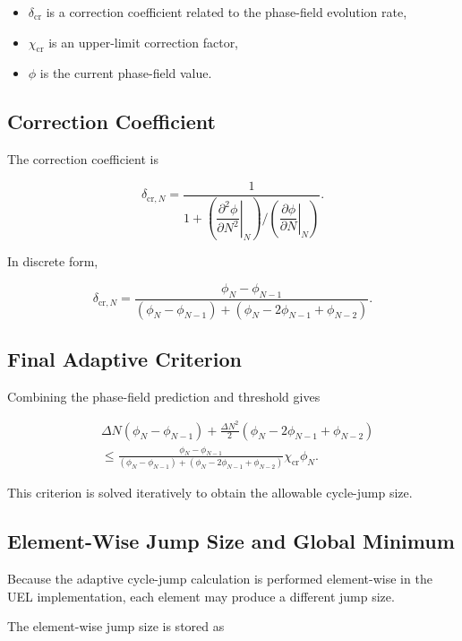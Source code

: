 ﻿\documentclass[11pt,a4paper]{article}
\begin{document}
\begin{itemize}[leftmargin=*]
    \item $\delta_{\mathrm{cr}}$ is a correction coefficient related to the phase-field evolution rate,
    \item $\chi_{\mathrm{cr}}$ is an upper-limit correction factor,
    \item $\phi$ is the current phase-field value.
\end{itemize}

\subsection{Correction Coefficient}

The correction coefficient is

\[
\delta_{\mathrm{cr},N}
=
\frac{1}{
1+
\left(
\left.
\dfrac{\partial^2\phi}{\partial N^2}
\right|_N
\right)
/
\left(
\left.
\dfrac{\partial \phi}{\partial N}
\right|_N
\right)
}.
\]

In discrete form,

\[
\delta_{\mathrm{cr},N}
=
\frac{\phi_N-\phi_{N-1}}
{
(\phi_N-\phi_{N-1})
+
(\phi_N-2\phi_{N-1}+\phi_{N-2})
}.
\]

\subsection{Final Adaptive Criterion}

Combining the phase-field prediction and threshold gives

\[
\begin{aligned}
&\Delta N(\phi_N-\phi_{N-1})
+
\frac{\Delta N^2}{2}
(\phi_N-2\phi_{N-1}+\phi_{N-2}) \\
&\leq
\frac{\phi_N-\phi_{N-1}}
{
(\phi_N-\phi_{N-1})
+
(\phi_N-2\phi_{N-1}+\phi_{N-2})
}
\chi_{\mathrm{cr}}\phi_N.
\end{aligned}
\]

This criterion is solved iteratively to obtain the allowable cycle-jump size.

\subsection{Element-Wise Jump Size and Global Minimum}

Because the adaptive cycle-jump calculation is performed element-wise in the UEL implementation, each element may produce a different jump size.

The element-wise jump size is stored as
\end{document}

